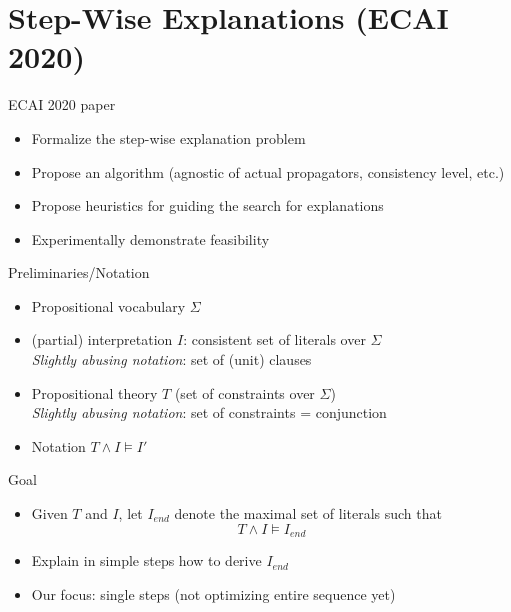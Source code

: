 \documentclass[12pt,aspectratio=169]{beamer}
\newcommand\m[1]{\ensuremath{#1}\xspace}
\begin{document}
\section{Step-Wise Explanations (ECAI 2020) } 
\begin{frame}{ECAI 2020 paper}
\begin{itemize}
\item Formalize the step-wise explanation problem
 \item Propose an algorithm (agnostic of actual propagators, consistency level, etc.) 
 \item Propose heuristics for guiding the search for explanations
 \item Experimentally demonstrate feasibility
\end{itemize}
 \end{frame}
 
 \begin{frame}{Preliminaries/Notation}
  \begin{itemize}
   \item Propositional vocabulary $\Sigma$
   \item (partial) interpretation $I$: consistent set of literals over $\Sigma$ \\
   \textit{Slightly abusing notation}: set of (unit) clauses
   \item Propositional theory $T$ (set of constraints over $\Sigma$) \\
      \textit{Slightly abusing notation}: set of constraints = conjunction
   \item Notation $T \land I \models I'$  
  \end{itemize}

 \end{frame}
 
 \newcommand\Iend{\m{I_{\mathit{end}}}}
 \begin{frame}{Goal}
   \begin{itemize}
    \item Given $T$ and $I$, let $\Iend$ denote the maximal set of literals such that 
    \[T \land I \models \Iend\]
    \item Explain in simple steps how to derive \Iend
    \item Our focus: single steps  (not optimizing entire sequence yet)
   \end{itemize}
 
 \end{frame}


 
 
\end{document}
